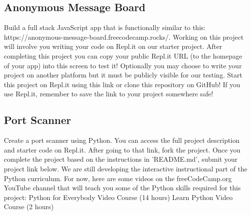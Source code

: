 \documentclass{article}%
\begin{document}
%
\subsection{Anonymous Message Board}%
\label{subsec:AnonymousMessageBoard}%
Build a full stack JavaScript app that is functionally similar to this: https://anonymous{-}message{-}board.freecodecamp.rocks/.\newline%
Working on this project will involve you writing your code on Repl.it on our starter project. After completing this project you can copy your public Repl.it URL (to the homepage of your app) into this screen to test it! Optionally you may choose to write your project on another platform but it must be publicly visible for our testing.\newline%
Start this project on Repl.it using this link or clone this repository on GitHub! If you use Repl.it, remember to save the link to your project somewhere safe!\newline%

%
\subsection{Port Scanner}%
\label{subsec:PortScanner}%
Create a port scanner using Python.\newline%
You can access the full project description and starter code on Repl.it.\newline%
After going to that link, fork the project. Once you complete the project based on the instructions in 'README.md', submit your project link below.\newline%
We are still developing the interactive instructional part of the Python curriculum. For now, here are some videos on the freeCodeCamp.org YouTube channel that will teach you some of the Python skills required for this project:\newline%
Python for Everybody Video Course (14 hours)\newline%
  \newline%
Learn Python Video Course (2 hours)\newline%
  \newline%

%
\end{document}
